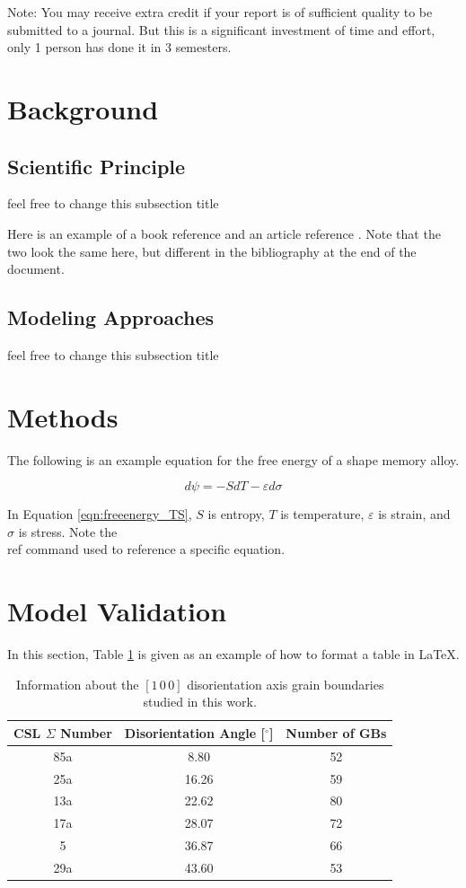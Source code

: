 \documentclass{article}
\begin{document}
\noindent Note: You may receive extra credit if your report is of sufficient quality to be submitted to a journal. But this is a significant investment of time and effort, only 1 person has done it in 3 semesters.


\section{Background}
\subsection{Scientific Principle}
feel free to change this subsection title


Here is an example of a book reference \cite{Pumphrey:1975dl} and an article reference \cite{Wolf:1992we}. Note that the two look the same here, but different in the bibliography at the end of the document.


\subsection{Modeling Approaches}
feel free to change this subsection title

\section{Methods}
\label{sec:methods}
The following is an example equation for the free energy of a shape memory alloy.

\begin{equation}
    d\psi = -S dT  - \varepsilon d\sigma
    \label{eqn:freeenergy_TS}
\end{equation}

\noindent In Equation \ref{eqn:freeenergy_TS}, $S$ is entropy, $T$ is temperature, $\varepsilon$ is strain, and $\sigma$ is stress. Note the \\ref{} command used to reference a specific equation.


\section{Model Validation}
\label{sec:validation}
In this section, Table \ref{tab:GBdata} is given as an example of how to format a table in \LaTeX{}.

\begin{table}
\centering
\caption{Information about the $\left[1\,0\,0\right]$ disorientation axis grain boundaries studied in this work.}   
   \begin{tabular}{ c c c}
   \hline
   CSL $\Sigma$ Number & Disorientation Angle [$^{\circ}$] & Number of GBs \\
   \hline
   85a & 8.80 & 52 \\
25a & 16.26 & 59 \\
13a & 22.62 & 80 \\
17a & 28.07 & 72 \\
  5 & 36.87 & 66 \\
29a & 43.60 & 53 \\
   \hline
   
   \end{tabular}
\label{tab:GBdata}   
\end{table}
\end{document}
